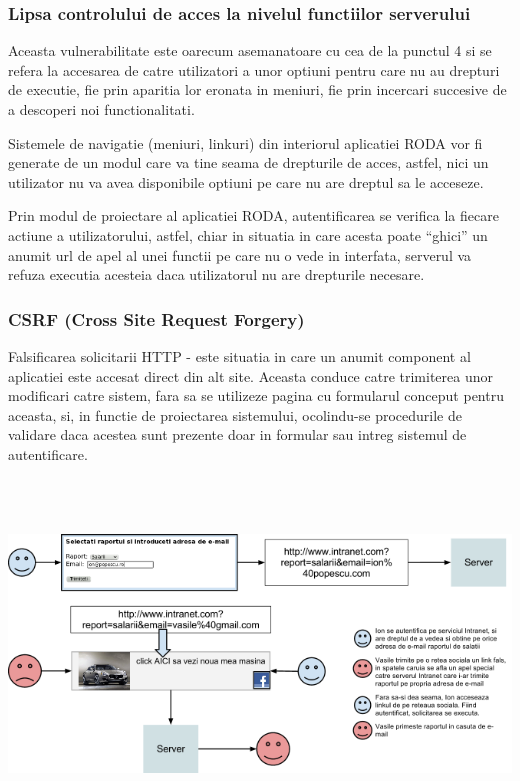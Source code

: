 \subsubsection{Lipsa controlului de acces la nivelul functiilor serverului}

Aceasta vulnerabilitate este oarecum asemanatoare cu cea de la punctul 4 si se refera la accesarea de catre utilizatori
a unor optiuni pentru care nu au drepturi de executie, fie prin aparitia lor eronata in meniuri, fie prin incercari
succesive de a descoperi noi functionalitati.

Sistemele de navigatie (meniuri, linkuri) din interiorul aplicatiei RODA vor fi generate de un modul care va tine seama
de drepturile de acces, astfel, nici un utilizator nu va avea disponibile optiuni pe care nu are dreptul sa le
acceseze.

Prin modul de proiectare al aplicatiei RODA, autentificarea se verifica la fiecare actiune a utilizatorului, astfel,
chiar in situatia in care acesta poate ``ghici'' un anumit url de apel al unei functii pe care nu o vede in interfata,
serverul va refuza executia acesteia daca utilizatorul nu are drepturile necesare.

\subsubsection{CSRF (Cross Site Request Forgery)}

Falsificarea solicitarii HTTP - este situatia in care un anumit component al aplicatiei este accesat direct din alt
site. Aceasta conduce catre trimiterea unor modificari catre sistem, fara sa se utilizeze pagina cu formularul conceput
pentru aceasta, si, in functie de proiectarea sistemului, ocolindu-se procedurile de validare daca acestea sunt
prezente doar in formular sau intreg sistemul de autentificare.

\includegraphics[width=6.8437in,height=3.6457in]{SecuritateaarhiveiRODA-img005.png} 

